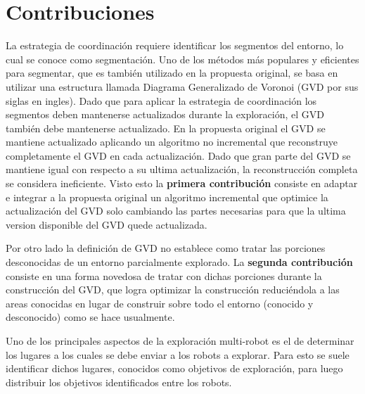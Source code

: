 \section{Contribuciones}\label{sec:cont}

La estrategia de coordinación requiere identificar los segmentos del entorno,
lo cual se conoce como segmentación. Uno de los métodos más populares y
eficientes para segmentar, que es también utilizado en la propuesta original, se
basa en utilizar una estructura llamada Diagrama Generalizado de Voronoi (GVD
por sus siglas en ingles). Dado que para aplicar la estrategia de coordinación
los segmentos deben mantenerse actualizados durante la exploración, el GVD
también debe mantenerse actualizado. En la propuesta original el GVD se
mantiene actualizado aplicando un algoritmo no incremental que
reconstruye completamente el GVD en cada actualización. Dado que gran parte del GVD se
mantiene igual con respecto a su ultima actualización, la reconstrucción
completa se considera ineficiente. Visto esto la \textbf{primera contribución}
consiste en adaptar e integrar a la propuesta original un algoritmo incremental
que optimice la actualización del GVD solo cambiando las partes necesarias para
que la ultima version disponible del GVD quede actualizada. 


Por otro lado la definición de GVD no establece como tratar las porciones
desconocidas de un entorno parcialmente explorado. La \textbf{segunda contribución}
consiste en una forma novedosa de tratar con dichas porciones durante la
construcción del GVD, que logra optimizar la construcción reduciéndola a las areas
conocidas en lugar de construir sobre todo el entorno (conocido y desconocido)
como se hace usualmente.

Uno de los principales aspectos de la exploración multi-robot es el de
determinar los lugares a los cuales se debe enviar a los robots a explorar.
Para esto se suele identificar dichos lugares, conocidos como objetivos de
exploración, para luego distribuir los objetivos identificados entre los robots.

